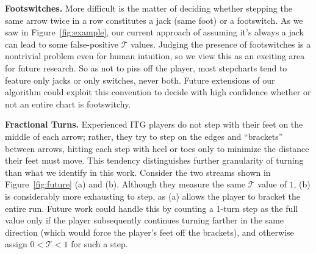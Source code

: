 \documentclass[10pt]{sigplanconf}
\begin{document}
{\bf Footswitches.} More difficult is the matter of deciding whether stepping the same arrow twice in a row constitutes a jack (same foot) or a footswitch. As we saw in Figure~\ref{fig:example}, our current approach of assuming it's always a jack can lead to some false-positive $\mathcal{T}$ values.
Judging the presence of footswitches is a nontrivial problem even for human intuition, so we view this as an exciting area for future research.
So as not to piss off the player, most stepcharts tend to feature only jacks or only switches, never both.
Future extensions of our algorithm could exploit this convention to decide with high confidence whether or not an entire chart is footswitchy.

{\bf Fractional Turns.}
Experienced ITG players do not step with their feet on the middle of each arrow; rather, they try to step on the edges and ``brackets'' between arrows, hitting each step with heel or toes only to minimize the distance their feet must move.
This tendency distinguishes further granularity of turning than what we identify in this work.
Consider the two streams shown in Figure~\ref{fig:future} (a) and (b).
Although they measure the same $\mathcal{T}$ value of $1$,
(b) is considerably more exhausting to step, as (a) allows the player to bracket the entire run.
Future work could handle this by counting a 1-turn step as the full value only if the player subsequently continues turning farther in the same direction (which would force the player's feet off the brackets), and otherwise assign $0<\mathcal{T}<1$ for such a step.
\end{document}
